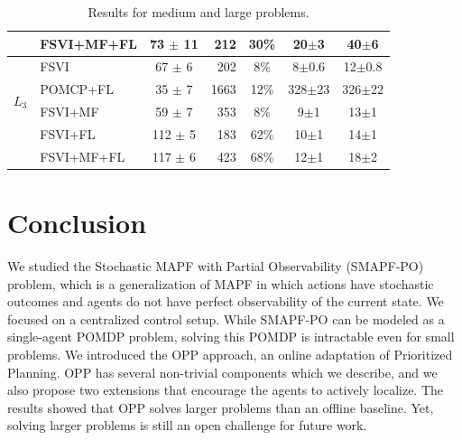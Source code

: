 \documentclass[letterpaper]{article} %
\newcommand{\itay}[1]{}
\begin{document}
\begin{table}
{\begin{tabular}{ |c|l|c|r|c|c|c| }
    & FSVI+MF+FL\itay{+} & 73 $\pm$ 11 & 212 & 30\% & 20$\pm$3 & 40$\pm$6 \\
    \hline \hline
    \multirow{4}{*}{$L_3$}
    & FSVI\itay{+} & 67 $\pm$ 6 & 202 & 8\% & 8$\pm$0.6 & 12$\pm$0.8 \\
    & POMCP+FL\itay{+} & 35 $\pm$ 7 & 1663 & 12\% & 328$\pm$23 & 326$\pm$22 \\
    & FSVI+MF\itay{+} & 59 $\pm$ 7 & 353 & 8\% & 9$\pm$1 & 13$\pm$1 \\
    &FSVI+FL\itay{+} & 112 $\pm$ 5 & 183 & 62\% & 10$\pm$1 & 14$\pm$1 \\
    & FSVI+MF+FL\itay{+} & 117 $\pm$ 6 & 423 & 68\% & 12$\pm$1 & 18$\pm$2 \\
    \hline
    \end{tabular}
    }
    \caption{Results for medium and large problems.}%
    \label{tab:large-results}
\end{table}






\section{Conclusion}

We studied the Stochastic MAPF with Partial Observability (SMAPF-PO) problem, which is a generalization of MAPF in which actions have stochastic outcomes and agents do not have perfect observability of the current state. We focused on a centralized control setup. While SMAPF-PO can be modeled as a single-agent POMDP problem, solving this POMDP is intractable even for small problems.
We introduced the OPP approach, an online adaptation of Prioritized Planning. OPP has several non-trivial components which we describe, and we also propose two extensions that encourage the agents to actively localize. The results showed that OPP solves larger problems than an offline baseline.
Yet, solving larger problems is still an open challenge for future work.





\end{document}

